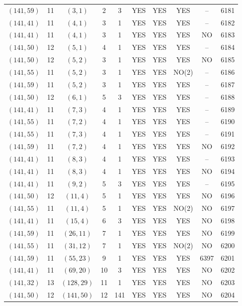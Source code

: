 \begin{longtable}{|c|c|c|c|c|c|c|c|c|c|}
$(141, 59)$ & 11 & $(3, 1)$ & 2 & 3 & YES & YES & YES & -- & 6181\\
$(141, 41)$ & 11 & $(4, 1)$ & 3 & 1 & YES & YES & YES & -- & 6182\\
$(141, 41)$ & 11 & $(4, 1)$ & 3 & 1 & YES & YES & YES & NO & 6183\\
$(141, 50)$ & 12 & $(5, 1)$ & 4 & 1 & YES & YES & YES & -- & 6184\\
$(141, 50)$ & 12 & $(5, 2)$ & 3 & 1 & YES & YES & YES & NO & 6185\\
$(141, 55)$ & 11 & $(5, 2)$ & 3 & 1 & YES & YES & NO(2) & -- & 6186\\
$(141, 59)$ & 11 & $(5, 2)$ & 3 & 1 & YES & YES & YES & -- & 6187\\
$(141, 50)$ & 12 & $(6, 1)$ & 5 & 3 & YES & YES & YES & -- & 6188\\
$(141, 41)$ & 11 & $(7, 3)$ & 4 & 1 & YES & YES & YES & -- & 6189\\
$(141, 55)$ & 11 & $(7, 2)$ & 4 & 1 & YES & YES & YES & -- & 6190\\
$(141, 55)$ & 11 & $(7, 3)$ & 4 & 1 & YES & YES & YES & -- & 6191\\
$(141, 59)$ & 11 & $(7, 2)$ & 4 & 1 & YES & YES & YES & NO & 6192\\
$(141, 41)$ & 11 & $(8, 3)$ & 4 & 1 & YES & YES & YES & -- & 6193\\
$(141, 41)$ & 11 & $(8, 3)$ & 4 & 1 & YES & YES & YES & NO & 6194\\
$(141, 41)$ & 11 & $(9, 2)$ & 5 & 3 & YES & YES & YES & -- & 6195\\
$(141, 50)$ & 12 & $(11, 4)$ & 5 & 1 & YES & YES & YES & NO & 6196\\
$(141, 55)$ & 11 & $(11, 4)$ & 5 & 1 & YES & YES & NO(2) & NO & 6197\\
$(141, 41)$ & 11 & $(15, 4)$ & 6 & 3 & YES & YES & YES & NO & 6198\\
$(141, 59)$ & 11 & $(26, 11)$ & 7 & 1 & YES & YES & YES & NO & 6199\\
$(141, 55)$ & 11 & $(31, 12)$ & 7 & 1 & YES & YES & NO(2) & NO & 6200\\
$(141, 59)$ & 11 & $(55, 23)$ & 9 & 1 & YES & YES & YES & 6397 & 6201\\
$(141, 41)$ & 11 & $(69, 20)$ & 10 & 3 & YES & YES & YES & NO & 6202\\
$(141, 32)$ & 13 & $(128, 29)$ & 11 & 1 & YES & YES & YES & NO & 6203\\
$(141, 50)$ & 12 & $(141, 50)$ & 12 & 141 & YES & YES & YES & NO & 6204\\

\end{longtable}
